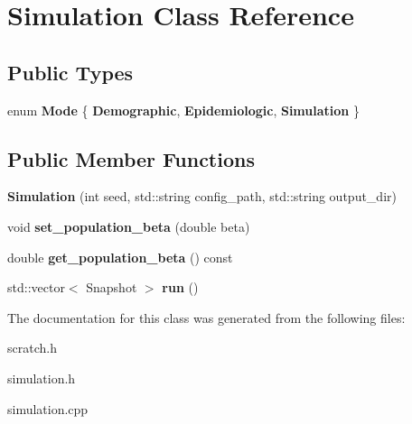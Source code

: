 \hypertarget{class_simulation}{}\section{Simulation Class Reference}
\label{class_simulation}
\subsection*{Public Types}
\begin{DoxyCompactItemize}
\item 
\mbox{\label{class_simulation_acdec9ef2f95cac1b13493fd8436ae140}} 
enum {\bfseries Mode} \{ {\bfseries Demographic}, 
{\bfseries Epidemiologic}, 
{\bfseries Simulation}
 \}
\end{DoxyCompactItemize}
\subsection*{Public Member Functions}
\begin{DoxyCompactItemize}
\item 
\mbox{\label{class_simulation_a19a6806604e22961e5239d09fd47fcfc}} 
{\bfseries Simulation} (int seed, std\+::string config\+\_\+path, std\+::string output\+\_\+dir)
\item 
\mbox{\label{class_simulation_adbbb20197026d6b23340b8e6ce1c0ebc}} 
void {\bfseries set\+\_\+population\+\_\+beta} (double beta)
\item 
\mbox{\label{class_simulation_a3f97c8ff822efbe01fad01fed16031d5}} 
double {\bfseries get\+\_\+population\+\_\+beta} () const
\item 
\mbox{\label{class_simulation_a956d3e04043017ec5a5cc843f95290fa}} 
std\+::vector$<$ Snapshot $>$ {\bfseries run} ()
\end{DoxyCompactItemize}


The documentation for this class was generated from the following files\+:\begin{DoxyCompactItemize}
\item 
scratch.\+h\item 
simulation.\+h\item 
simulation.\+cpp\end{DoxyCompactItemize}
